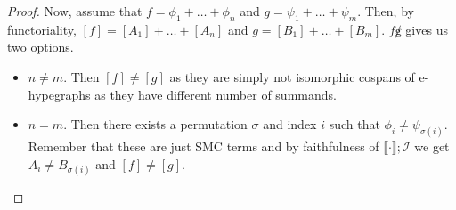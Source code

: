 \begin{theorem}
\begin{proof}

Now, assume that $f = \phi_1 + \ldots + \phi_n$ and $g = \psi_1 + \ldots + \psi_m$.
Then, by functoriality, $[f] = [A_1] + \ldots + [A_n]$ and $g = [B_1] + \ldots + [B_m]$. 
$f \not g$ gives us two options.

\begin{itemize}
    \item $n \not = m$. Then $[f] \not = [g]$ as they are simply not isomorphic cospans of e-hypegraphs as they have different number of summands.
    \item $n = m$. Then there exists a permutation $\sigma$ and index $i$ such that $\phi_i \not = \psi_{\sigma(i)}$. Remember that these are just SMC terms and by faithfulness of $\llbracket \cdot \rrbracket;\mathcal{I}$ we get $A_i \not = B_{\sigma(i)}$ and $[f] \not = [g]$.
\end{itemize}

\end{proof}
\end{theorem}


